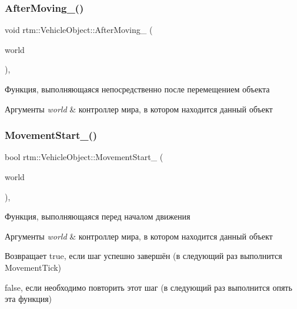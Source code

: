 \subsubsection{\texorpdfstring{After\+Moving\+\_\+()}{AfterMoving\_()}}
{\footnotesize\ttfamily void rtm\+::\+Vehicle\+Object\+::\+After\+Moving\+\_\+ (\begin{DoxyParamCaption}\item[{\hyperlink{classrtm_1_1_world_controller}{World\+Controller} $\ast$const}]{world }\end{DoxyParamCaption})\hspace{0.3cm}{\ttfamily [protected]}, {\ttfamily [virtual]}}

Функция, выполняющаяся непосредственно после перемещением объекта 
\begin{DoxyParams}{Аргументы}
{\em world} & контроллер мира, в котором находится данный объект \\
\hline
\end{DoxyParams}
\mbox{\label{classrtm_1_1_vehicle_object_aa02e0b8f3fa159939f370938e45abf88}} 
\subsubsection{\texorpdfstring{Movement\+Start\+\_\+()}{MovementStart\_()}}
{\footnotesize\ttfamily bool rtm\+::\+Vehicle\+Object\+::\+Movement\+Start\+\_\+ (\begin{DoxyParamCaption}\item[{\hyperlink{classrtm_1_1_world_controller}{World\+Controller} $\ast$const}]{world }\end{DoxyParamCaption})\hspace{0.3cm}{\ttfamily [protected]}, {\ttfamily [virtual]}}

Функция, выполняющаяся перед началом движения 
\begin{DoxyParams}{Аргументы}
{\em world} & контроллер мира, в котором находится данный объект \\
\hline
\end{DoxyParams}
\begin{DoxyReturn}{Возвращает}
true, если шаг успешно завершён (в следующий раз выполнится Movement\+Tick) 

false, если необходимо повторить этот шаг (в следующий раз выполнится опять эта функция) 
\end{DoxyReturn}


